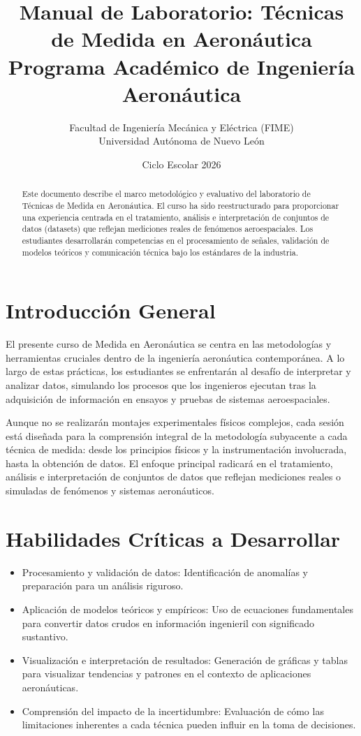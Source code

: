 \documentclass[11pt, a4paper]{article}
\title{Manual de Laboratorio: Técnicas de Medida en Aeronáutica\\ \Large Programa Académico de Ingeniería Aeronáutica}
\author{Facultad de Ingeniería Mecánica y Eléctrica (FIME) \\ Universidad Autónoma de Nuevo León}
\date{Ciclo Escolar 2026}
\begin{document}
\maketitle

\begin{abstract}
Este documento describe el marco metodológico y evaluativo del laboratorio de Técnicas de Medida en Aeronáutica. El curso ha sido reestructurado para proporcionar una experiencia centrada en el tratamiento, análisis e interpretación de conjuntos de datos (datasets) que reflejan mediciones reales de fenómenos aeroespaciales. Los estudiantes desarrollarán competencias en el procesamiento de señales, validación de modelos teóricos y comunicación técnica bajo los estándares de la industria.
\end{abstract}

\tableofcontents

\newpage

\section{Introducción General}
El presente curso de Medida en Aeronáutica se centra en las metodologías y herramientas cruciales dentro de la ingeniería aeronáutica contemporánea. A lo largo de estas prácticas, los estudiantes se enfrentarán al desafío de interpretar y analizar datos, simulando los procesos que los ingenieros ejecutan tras la adquisición de información en ensayos y pruebas de sistemas aeroespaciales.

Aunque no se realizarán montajes experimentales físicos complejos, cada sesión está diseñada para la comprensión integral de la metodología subyacente a cada técnica de medida: desde los principios físicos y la instrumentación involucrada, hasta la obtención de datos. El enfoque principal radicará en el tratamiento, análisis e interpretación de conjuntos de datos que reflejan mediciones reales o simuladas de fenómenos y sistemas aeronáuticos.

\section{Habilidades Críticas a Desarrollar}
\begin{itemize}[label=-]
    \item Procesamiento y validación de datos: Identificación de anomalías y preparación para un análisis riguroso.
    \item Aplicación de modelos teóricos y empíricos: Uso de ecuaciones fundamentales para convertir datos crudos en información ingenieril con significado sustantivo.
    \item Visualización e interpretación de resultados: Generación de gráficas y tablas para visualizar tendencias y patrones en el contexto de aplicaciones aeronáuticas.
    \item Comprensión del impacto de la incertidumbre: Evaluación de cómo las limitaciones inherentes a cada técnica pueden influir en la toma de decisiones.
\end{itemize}
\end{document}
